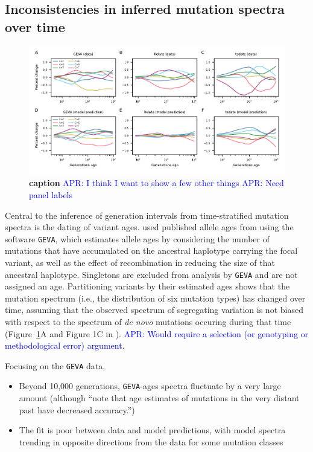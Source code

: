 \documentclass[]{article}
\newcommand{\aprcomment}[1]{{\textcolor{blue}{APR: #1}}}
\newcommand{\GEVA}{\texttt{GEVA}\xspace}
\begin{document}
\subsection*{Inconsistencies in inferred mutation spectra over time}

\begin{figure}[t!]
    \centering
    \includegraphics{../plots/fig1.pdf}
    \caption{
        \textbf{caption}
        \aprcomment{I think I want to show a few other things}
        \aprcomment{Need panel labels}
    }
    \label{fig:spectrum-ages}
\end{figure}

Central to the inference of generation intervals from time-stratified mutation
spectra is the dating of variant ages. \citet{wang2023human} used published
allele ages from \citet{albers2020dating} using the software \GEVA, which
estimates allele ages by considering the number of mutations that have
accumulated on the ancestral haplotype carrying the focal variant, as well as
the effect of recombination in reducing the size of that ancestral haplotype.
Singletons are excluded from analysis by \GEVA and are not assigned an age.
Partitioning variants by their estimated ages shows that the mutation spectrum
(i.e., the distribution of six mutation types) has changed over time, assuming
that the observed spectrum of segregating variation is not biased with respect
to the spectrum of \emph{de novo} mutations occuring during that time
(Figure~\ref{fig:spectrum-ages}A and Figure 1C in \citet{wang2023human}).
\aprcomment{Would require a selection (or genotyping or methodological error)
argument.}

Focusing on the \GEVA data,
\begin{itemize}
    \item Beyond 10,000 generations, \GEVA-ages spectra fluctuate by a
        very large amount (although \citet{wang2023human} ``note that age
        estimates of mutations in the very distant past have decreased
        accuracy.'')
    \item The fit is poor between data and model predictions, with model
        spectra trending in opposite directions from the data for some
        mutation classes \citep{gao2022limited}
\end{itemize}
\end{document}
